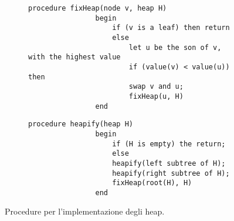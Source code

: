 \documentclass{subfiles}
\begin{document}
\begin{figure}[!h]
    \centering
    \begin{subfigure}[b]{0.75\textwidth}
        \begin{lstlisting}[language = algol]
            procedure fixHeap(node v, heap H)
                begin
                    if (v is a leaf) then return
                    else
                        let u be the son of v, with the highest value
                        if (value(v) < value(u)) then
                        swap v and u;
                        fixHeap(u, H)
                end
        \end{lstlisting}
    \end{subfigure}
    \begin{subfigure}[b]{0.5\textwidth}
        \begin{lstlisting}[language = algol]
            procedure heapify(heap H)
                begin
                    if (H is empty) the return;
                    else
                    heapify(left subtree of H);
                    heapify(right subtree of H);
                    fixHeap(root(H), H)
                end
        \end{lstlisting}
    \end{subfigure}
    \caption{Procedure per l'implementazione degli heap.}
    \label{Fig:4.5}
\end{figure}
\end{document}
